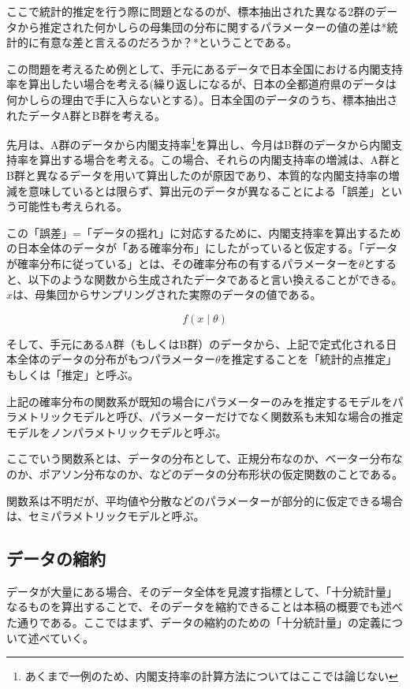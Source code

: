 \documentclass[a4paper,dvipdfmx]{jsarticle}
\begin{document}
ここで統計的推定を行う際に問題となるのが、標本抽出された異なる2群のデータから推定された何かしらの母集団の分布に関するパラメーターの値の差は*統計的に有意な差と言えるのだろうか？*ということである。

この問題を考えるため例として、手元にあるデータで日本全国における内閣支持率を算出したい場合を考える(繰り返しになるが、日本の全都道府県のデータは何かしらの理由で手に入らないとする）。日本全国のデータのうち、標本抽出されたデータA群とB群を考える。

先月は、A群のデータから内閣支持率\footnote{あくまで一例のため、内閣支持率の計算方法についてはここでは論じない}を算出し、今月はB群のデータから内閣支持率を算出する場合を考える。この場合、それらの内閣支持率の増減は、A群とB群と異なるデータを用いて算出したのが原因であり、本質的な内閣支持率の増減を意味しているとは限らず、算出元のデータが異なることによる「誤差」という可能性も考えられる。

この「誤差」=「データの揺れ」に対応するために、内閣支持率を算出するための日本全体のデータが「ある確率分布」にしたがっていると仮定する。「データが確率分布に従っている」とは、その確率分布の有するパラメーターを$\theta$とすると、以下のような関数から生成されたデータであると言い換えることができる。$x$は、母集団からサンプリングされた実際のデータの値である。

\begin{equation}
f(x \mid \theta)
\end{equation}

そして、手元にあるA群（もしくはB群）のデータから、上記で定式化される日本全体のデータの分布がもつパラメーター$\theta$を推定することを「統計的点推定」もしくは「推定」と呼ぶ。

上記の確率分布の関数系が既知の場合にパラメーターのみを推定するモデルをパラメトリックモデルと呼び、パラメーターだけでなく関数系も未知な場合の推定モデルをノンパラメトリックモデルと呼ぶ。

ここでいう関数系とは、データの分布として、正規分布なのか、ベーター分布なのか、ポアソン分布なのか、などのデータの分布形状の仮定関数のことである。

関数系は不明だが、平均値や分散などのパラメーターが部分的に仮定できる場合は、セミパラメトリックモデルと呼ぶ。


\subsection{データの縮約}

データが大量にある場合、そのデータ全体を見渡す指標として、「十分統計量」なるものを算出することで、そのデータを縮約できることは本稿の概要でも述べた通りである。ここではまず、データの縮約のための「十分統計量」の定義について述べていく。
\end{document}
